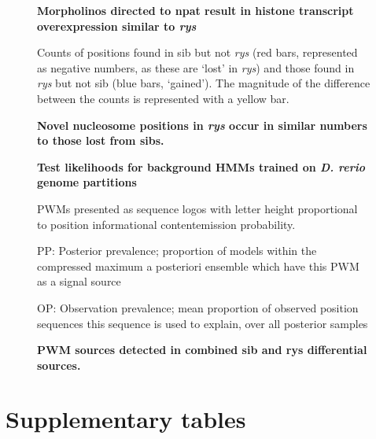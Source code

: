 \begin{figure}[!h]
    \caption{{\bf Morpholinos directed to npat result in histone transcript overexpression similar to \textit{rys}}} 
    \label{morpholinoRTPCR}
\end{figure}

\begin{figure}[!h]
    \caption{{\bf Novel nucleosome positions in \textit{rys} occur in similar numbers to those lost from sibs.}}
    Counts of positions found in sib but not \textit{rys} (red bars, represented as negative numbers, as these are `lost' in \textit{rys}) and those found in \textit{rys} but not sib (blue bars, `gained'). The magnitude of the difference between the counts is represented with a yellow bar.
    \label{diffposdist}
\end{figure}

\begin{figure}[!h]
    \caption{{\bf Test likelihoods for background HMMs trained on \textit{D. rerio} genome partitions}}
    \label{BHMMlh}
\end{figure}

\begin{figure}[!h]
    \caption{{\bf PWM sources detected in combined sib and rys differential sources.}}
    PWMs presented as sequence logos with letter height proportional to position informational content\/emission probability.
    
    PP: Posterior prevalence; proportion of models within the compressed maximum a posteriori ensemble which have this PWM as a signal source

    OP: Observation prevalence; mean proportion of observed position sequences this sequence is used to explain, over all posterior samples
    \label{combinedmotifs}
\end{figure}

\FloatBarrier

\section{Supplementary tables}

